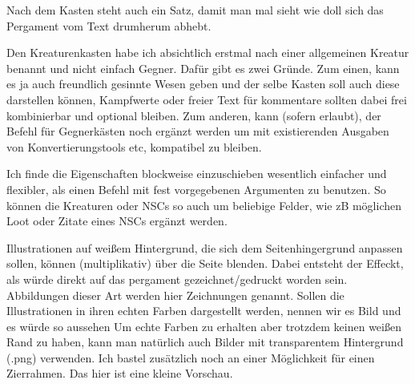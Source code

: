 \documentclass{Ilaris}
\begin{document}
Nach dem Kasten steht auch ein Satz, damit man mal sieht wie doll sich das Pergament vom Text drumherum abhebt.
\spaltenumbruch

Den Kreaturenkasten habe ich absichtlich erstmal nach einer allgemeinen Kreatur benannt und nicht einfach Gegner. Dafür gibt es zwei Gründe. Zum einen, kann es ja auch freundlich gesinnte Wesen geben und der selbe Kasten soll auch diese darstellen können, Kampfwerte oder freier Text für kommentare sollten dabei frei kombinierbar und optional bleiben. Zum anderen, kann (sofern erlaubt), der Befehl für Gegnerkästen noch ergänzt werden um mit existierenden Ausgaben von Konvertierungstools etc, kompatibel zu bleiben.



Ich finde die Eigenschaften blockweise einzuschieben wesentlich einfacher und flexibler, als einen Befehl mit fest vorgegebenen Argumenten zu benutzen. So können die Kreaturen oder NSCs so auch um beliebige Felder, wie zB möglichen Loot oder Zitate eines NSCs ergänzt werden.








Illustrationen auf weißem Hintergrund, die sich dem Seitenhingergrund anpassen sollen, können (multiplikativ) über die Seite blenden. Dabei entsteht der Effeckt, als würde direkt auf das pergament gezeichnet/gedruckt worden sein. Abbildungen dieser Art werden hier Zeichnungen genannt.
Sollen die Illustrationen in ihren echten Farben dargestellt werden, nennen wir es Bild und es würde so aussehen
Um echte Farben zu erhalten aber trotzdem keinen weißen Rand zu haben, kann man natürlich auch Bilder mit transparentem Hintergrund (.png) verwenden.
Ich bastel zusätzlich noch an einer Möglichkeit für einen Zierrahmen. Das hier ist eine kleine Vorschau.
\end{document}
